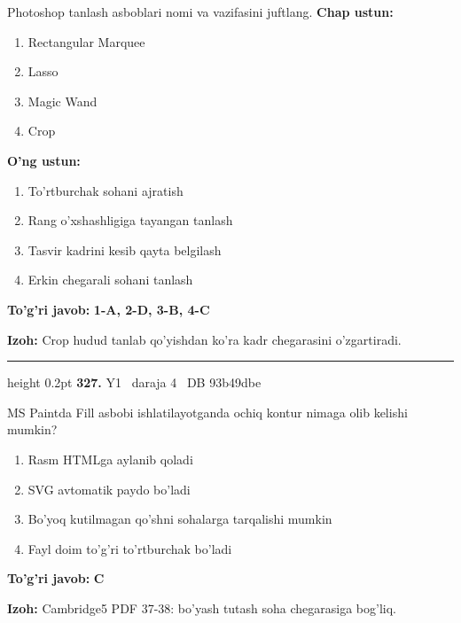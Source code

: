 \documentclass[10pt,a4paper,oneside]{article}
\begin{document}
\par
Photoshop tanlash asboblari nomi va vazifasini juftlang.
\textbf{\footnotesize Chap ustun:}
\begin{enumerate}[label=\arabic*),leftmargin=9mm]
\item Rectangular Marquee
\item Lasso
\item Magic Wand
\item Crop
\end{enumerate}
\textbf{\footnotesize O'ng ustun:}
\begin{enumerate}[label=\Alph*),leftmargin=9mm]
\item To'rtburchak sohani ajratish
\item Rang o'xshashligiga tayangan tanlash
\item Tasvir kadrini kesib qayta belgilash
\item Erkin chegarali sohani tanlash
\end{enumerate}
\begin{tcolorbox}[enhanced,breakable,colback=teal!4,colframe=teal!45!black,boxrule=0.45pt,arc=1.2mm,left=2.8mm,right=2.8mm,top=2mm,bottom=2mm,before skip=2mm,after skip=2mm]
\textbf{\color{teal}To'g'ri javob:} \textbf{1-A, 2-D, 3-B, 4-C}
\par\smallskip
\textbf{Izoh:} Crop hudud tanlab qo'yishdan ko'ra kadr chegarasini o'zgartiradi.
\end{tcolorbox}
\vspace{2mm}\hrule height 0.2pt \vspace{4mm}
\hypertarget{q327}{\textbf{\color{ink}327.}}  {\color{muted}\scriptsize Y1 \textbullet\ daraja 4 \textbullet\ DB 93b49dbe}
\par
MS Paintda Fill asbobi ishlatilayotganda ochiq kontur nimaga olib kelishi mumkin?
\begin{enumerate}[label=\Alph*),leftmargin=9mm]
\item Rasm HTMLga aylanib qoladi
\item SVG avtomatik paydo bo'ladi
\item Bo'yoq kutilmagan qo'shni sohalarga tarqalishi mumkin
\item Fayl doim to'g'ri to'rtburchak bo'ladi
\end{enumerate}
\begin{tcolorbox}[enhanced,breakable,colback=teal!4,colframe=teal!45!black,boxrule=0.45pt,arc=1.2mm,left=2.8mm,right=2.8mm,top=2mm,bottom=2mm,before skip=2mm,after skip=2mm]
\textbf{\color{teal}To'g'ri javob:} \textbf{C}
\par\smallskip
\textbf{Izoh:} Cambridge5 PDF 37-38: bo'yash tutash soha chegarasiga bog'liq.
\end{tcolorbox}
\end{document}
